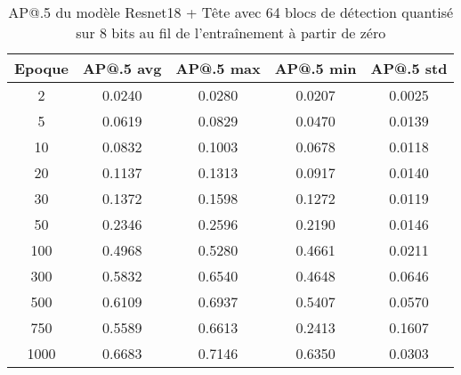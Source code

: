 \begin{table}[!ht]
    \caption{AP@.5 du modèle Resnet18 + Tête avec 64 blocs de détection quantisé sur 8 bits au fil de l'entraînement à partir de zéro}
    \label{tab:qresnet18+head_64n_ap50_8b_from_scratch}
    \centering
    \begin{tabular}{ |c||c|c|c|c|  }
        \hline
        \rowcolor{gray!50}
        Epoque & AP@.5 avg & AP@.5 max & AP@.5 min & AP@.5 std\\
        \hline
        2 & 0.0240 & 0.0280 & 0.0207 & 0.0025\\
        5 & 0.0619 & 0.0829 & 0.0470 & 0.0139\\
        10 & 0.0832 & 0.1003 & 0.0678 & 0.0118\\
        20 & 0.1137 & 0.1313 & 0.0917 & 0.0140\\
        30 & 0.1372 & 0.1598 & 0.1272 & 0.0119\\
        50 & 0.2346 & 0.2596 & 0.2190 & 0.0146\\
        100 & 0.4968 & 0.5280 & 0.4661 & 0.0211\\
        300 & 0.5832 & 0.6540 & 0.4648 & 0.0646\\
        500 & 0.6109 & 0.6937 & 0.5407 & 0.0570\\
        750 & 0.5589 & 0.6613 & 0.2413 & 0.1607\\
        1000 & 0.6683 & 0.7146 & 0.6350 & 0.0303\\
        \hline
    \end{tabular}
\end{table}

